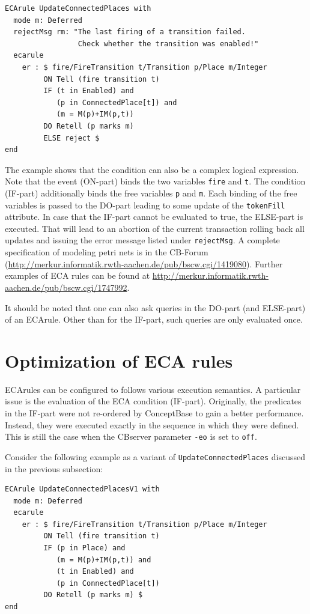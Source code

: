 {\small
\begin{verbatim}
ECArule UpdateConnectedPlaces with
  mode m: Deferred
  rejectMsg rm: "The last firing of a transition failed. 
                 Check whether the transition was enabled!"
  ecarule
    er : $ fire/FireTransition t/Transition p/Place m/Integer
         ON Tell (fire transition t)
         IF (t in Enabled) and
            (p in ConnectedPlace[t]) and
            (m = M(p)+IM(p,t))
         DO Retell (p marks m)
         ELSE reject $
end
\end{verbatim}
}

The example shows that the condition can also be a complex logical expression.
Note that the event (ON-part) binds the two variables {\tt fire} and {\tt t}.
The condition (IF-part) additionally binds the free variables {\tt p} and {\tt m}.
Each binding of the free variables is passed to the DO-part
leading to some update of the {\tt tokenFill} attribute. In case that the IF-part cannot be
evaluated to true, the ELSE-part is executed. That will lead to an abortion of the current
transaction rolling back all updates and issuing the error message listed under
{\tt rejectMsg}. A complete specification of modeling petri nets is in the CB-Forum
(\url{http://merkur.informatik.rwth-aachen.de/pub/bscw.cgi/1419080}).
Further examples of ECA rules can be found at
\url{http://merkur.informatik.rwth-aachen.de/pub/bscw.cgi/1747992}.

It should be noted that one can also ask queries in the DO-part (and ELSE-part) of
an ECArule. Other than for the IF-part, such queries are only evaluated once.



\section{Optimization of ECA rules}

ECArules can be configured to follows various execution semantics. 
A particular issue is the evaluation of the ECA condition
(IF-part). Originally, the predicates in the IF-part were not re-ordered
by ConceptBase to gain a better performance. Instead, they
were executed exactly in the sequence in which they were defined.
This is still the case when the CBserver parameter {\tt -eo}  is 
set to {\tt off}.

Consider the following example as a variant of {\tt UpdateConnectedPlaces}
discussed in the previous subsection:

{\small
\begin{verbatim}
ECArule UpdateConnectedPlacesV1 with
  mode m: Deferred
  ecarule
    er : $ fire/FireTransition t/Transition p/Place m/Integer
         ON Tell (fire transition t)
         IF (p in Place) and
            (m = M(p)+IM(p,t)) and
            (t in Enabled) and 
            (p in ConnectedPlace[t])
         DO Retell (p marks m) $
end
\end{verbatim}
}

